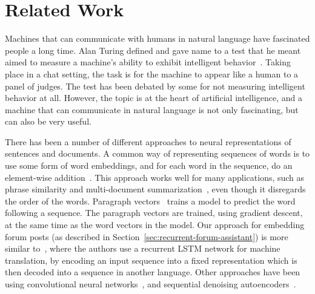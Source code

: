 \documentclass[11pt]{article}
\newenvironment{reasonable}{\par\color{blue}}{\par}
\newenvironment{reasonable}{\par\color{black}}{\par}
\begin{document}


\vspace{1em}

\section{Related Work}

\begin{reasonable}
Machines that can communicate with humans in natural language have fascinated people a long time. 
Alan Turing defined and gave name to a test that he meant aimed to measure a machine's ability to exhibit intelligent behavior~\cite{turing1950computing}.
Taking place in a chat setting, the task is for the machine to appear like a human to a panel of judges.
The test has been debated by some for not measuring intelligent behavior at all.
However, the topic is at the heart of artificial intelligence, and a machine that can communicate in natural language is not only fascinating, but can also be very useful.



There has been a number of different approaches to neural representations of sentences and documents.
A common way of representing sequences of words is to use some form of word embeddings, and for each word in the sequence, do an element-wise addition~\cite{mitchell2010composition}.
This approach works well for many applications, such as phrase similarity and multi-document summarization~\cite{mogren2015extractive}, even though it disregards the order of the words.
Paragraph vectors~\cite{le2014distributed} trains a model to predict the word following a sequence.
The paragraph vectors are trained, using gradient descent, at the same time as the word vectors in the model.
Our approach for embedding forum posts (as described in Section~\ref{sec:recurrent-forum-assistant}) is more similar to~\cite{cho2014learning}, where the authors use a recurrent LSTM network for machine translation, by encoding an input sequence into a fixed representation which is then decoded into a sequence in another language.
Other approaches have been using convolutional neural networks~\cite{blunsom2014convolutional}, and sequential denoising autoencoders~\cite{hill2016learning}.


\end{reasonable}
\end{document}
